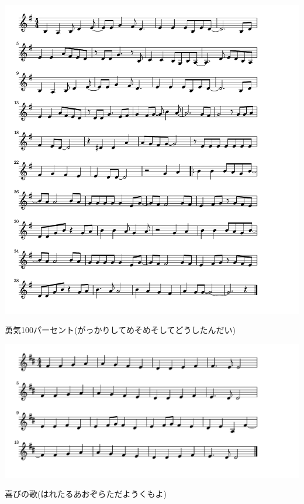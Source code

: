\documentclass[a4paper]{ltjsarticle}
\begin{document}
\includegraphics[clip]{yuki100p_crop.pdf}

\vspace{-10mm} \hspace{10mm}
勇気100パーセント(がっかりしてめそめそしてどうしたんだい)

\includegraphics[clip]{yorokobi_crop.pdf}

\vspace{-10mm} \hspace{10mm}
喜びの歌(はれたるあおぞらただようくもよ)

\newpage
\printindex
\end{document}
